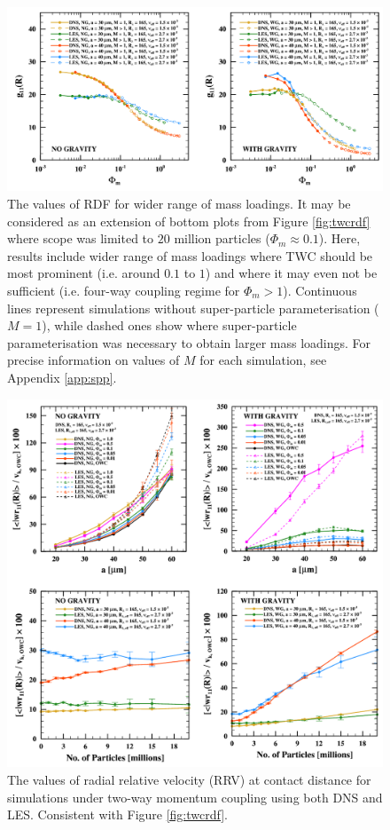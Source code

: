 \begin{figure}
\centering
\includegraphics[width=13.5cm]{figures/2-09_twcrdfext.pdf}
\caption{
The values of RDF for wider range of mass loadings.
It may be considered as an extension of bottom plots from Figure \ref{fig:twcrdf} where scope was limited to $20$ million particles (${\Phi_m \approx 0.1}$).
Here, results include wider range of mass loadings where TWC should be most prominent (i.e. around $0.1$ to $1$) and where it may even not be sufficient (i.e. four-way coupling regime for $\Phi_m > 1$).
Continuous lines represent simulations without super-particle parameterisation ($M=1$), while dashed ones show where super-particle parameterisation was necessary to obtain larger mass loadings.
For precise information on values of $M$ for each simulation, see Appendix \ref{app:spp}. 
}
\label{fig:twcrdfext}
\end{figure}


\begin{figure}
\centering
\includegraphics[width=13.5cm]{figures/2-10_twcrrv.pdf}
\caption{
The values of radial relative velocity (RRV) at contact distance for simulations under two-way momentum coupling using both DNS and LES.
Consistent with Figure \ref{fig:twcrdf}.
}
\label{fig:twcrrv}
\end{figure}

